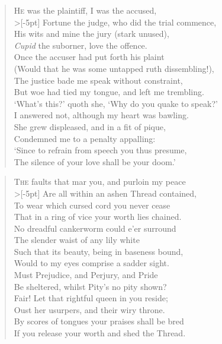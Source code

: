 \documentclass[a5paper, oneside]{memoir}
\begin{document}
\PoemTitle{}
\begin{verse}
    \lettrine{H}{e} was the plaintiff, I was the accused, \\>[-5pt]
    Fortune the judge, who did the trial commence, \\
    His wits and mine the jury (stark unused), \\
    \textit{Cupid} the suborner, love the offence. \\
    Once the accuser had put forth his plaint \\
    (Would that he was some untapped ruth dissembling!), \\
    The justice bade me speak without constraint, \\
    But woe had tied my tongue, and left me trembling. \\
    `What's this?' quoth she, `Why do you quake to speak?' \\
    I answered not, although my heart was bawling. \\
    She grew displeased, and in a fit of pique, \\
    Condemned me to a penalty appalling: \\
    \vin `Since to refrain from speech you thus presume, \\
    \vin The silence of your love shall be your doom.'
\end{verse}

\PoemTitle{}
\begin{verse}
    \lettrine{T}{he} faults that mar you, and purloin my peace \\>[-5pt]
    Are all within an ashen Thread contained, \\
    To wear which cursed cord you never cease \\
    That in a ring of vice your worth lies chained. \\
    No dreadful cankerworm could e'er surround \\
    The slender waist of any lily white \\
    Such that its beauty, being in baseness bound, \\
    Would to my eyes comprise a sadder sight. \\
    Must Prejudice, and Perjury, and Pride \\
    Be sheltered, whilst Pity's no pity shown? \\
    Fair! Let that rightful queen in you reside; \\
    Oust her usurpers, and their wiry throne. \\
    \vin By scores of tongues your praises shall be bred \\
    \vin If you release your worth and shed the Thread.
\end{verse}
\end{document}
